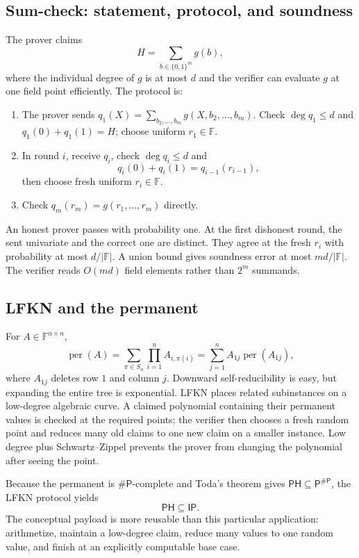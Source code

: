 \documentclass[10pt]{article}
\newcommand{\F}{\mathbb F}
\newcommand{\IP}{\mathsf{IP}}
\newcommand{\PH}{\mathsf{PH}}
\begin{document}
\subsection{Sum-check: statement, protocol, and soundness}

The prover claims
\[
 H=\sum_{b\in\{0,1\}^m}g(b),
\]
where the individual degree of $g$ is at most $d$ and the verifier can evaluate
$g$ at one field point efficiently.  The protocol is:
\begin{enumerate}
\item The prover sends
$q_1(X)=\sum_{b_2,\ldots,b_m}g(X,b_2,\ldots,b_m)$.
Check $\deg q_1\leq d$ and $q_1(0)+q_1(1)=H$; choose uniform $r_1\in\F$.
\item In round $i$, receive $q_i$, check $\deg q_i\leq d$ and
\[
 q_i(0)+q_i(1)=q_{i-1}(r_{i-1}),
\]
then choose fresh uniform $r_i\in\F$.
\item Check $q_m(r_m)=g(r_1,\ldots,r_m)$ directly.
\end{enumerate}
An honest prover passes with probability one.  At the first dishonest round,
the sent univariate and the correct one are distinct.  They agree at the fresh
$r_i$ with probability at most $d/|\F|$.  A union bound gives soundness error
at most $md/|\F|$.  The verifier reads $O(md)$ field elements rather than
$2^m$ summands.

\subsection{LFKN and the permanent}

For $A\in\F^{n\times n}$,
\[
 \operatorname{per}(A)=\sum_{\pi\in S_n}\prod_{i=1}^n A_{i,\pi(i)}
 =\sum_{j=1}^n A_{1j}\operatorname{per}(A_{1j}),
\]
where $A_{1j}$ deletes row $1$ and column $j$.  Downward self-reducibility is
easy, but expanding the entire tree is exponential.  LFKN places related
subinstances on a low-degree algebraic curve.  A claimed polynomial containing
their permanent values is checked at the required points; the verifier then
chooses a fresh random point and reduces many old claims to one new claim on a
smaller instance.  Low degree plus Schwartz--Zippel prevents the prover from
changing the polynomial after seeing the point.

Because the permanent is $\#\mathsf P$-complete and Toda's theorem gives
$\PH\subseteq\mathsf P^{\#\mathsf P}$, the LFKN protocol yields
\[
 \PH\subseteq\IP.
\]
The conceptual payload is more reusable than this particular application:
arithmetize, maintain a low-degree claim, reduce many values to one random
value, and finish at an explicitly computable base case.
\end{document}
